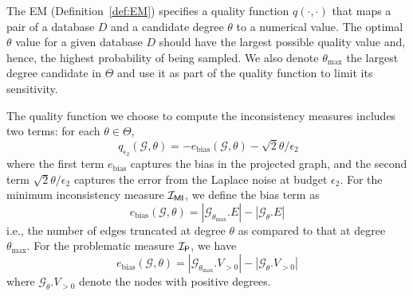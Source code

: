 The EM (Definition~\ref{def:EM}) specifies a quality function $q(\cdot,\cdot)$ that maps a pair of a database $D$ and a candidate degree $\theta$ to a numerical value. The optimal $\theta$ value for a given database $D$ should have the largest possible quality value and, hence, the highest probability of being sampled. We also denote $\theta_{\max}$ the largest degree candidate in $\Theta$ and use it as part of the quality function to limit its sensitivity.



The quality function we choose to compute the inconsistency measures includes two terms: for each $\theta\in \Theta$,
\begin{equation}~\label{eq:quality_function}
    q_{\epsilon_2}(\mathcal{G}, \theta) = - e_{\text{bias}}(\mathcal{G}, \theta) - {\sqrt{2}\theta}/{\epsilon_2}
\end{equation}
where the first term $e_{\text{bias}}$  captures the bias in the projected graph, and the second term ${\sqrt{2}\theta}/{\epsilon_2}$ captures the error from the Laplace noise at budget $\epsilon_2$. For the minimum inconsistency measure $\mathcal{I_{\mathsf{MI}}}$, we define the bias term as
\begin{equation}
e_{\text{bias}}(\mathcal{G},\theta) = |\mathcal{G}_{\theta_{\max}}.E| - |\mathcal{G}_\theta.E|    
\end{equation}
i.e., the number of edges truncated at degree $\theta$ as compared to that at degree $\theta_{\max}$. For the problematic measure $\mathcal{I_\mathsf{P}}$, we have 
\begin{equation}
e_{\text{bias}}(\mathcal{G}, \theta) = 
|\mathcal{G}_{\theta_{\max}}.V_{>0}| - |\mathcal{G}_{\theta}.V_{>0}|    
\end{equation} 
where $\mathcal{G}_\theta.V_{>0}$ denote the nodes with positive degrees. 

